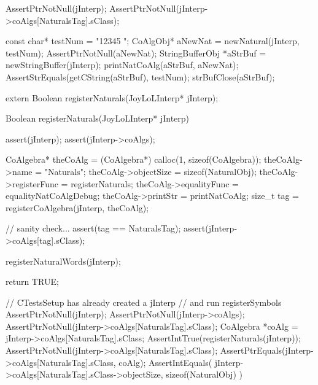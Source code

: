 
\startCTest
  AssertPtrNotNull(jInterp);
  AssertPtrNotNull(jInterp->coAlgs[NaturalsTag].sClass);

  const char* testNum = "12345 ";
  CoAlgObj* aNewNat = newNatural(jInterp, testNum);
  AssertPtrNotNull(aNewNat);
  StringBufferObj *aStrBuf = newStringBuffer(jInterp);
  printNatCoAlg(aStrBuf, aNewNat);
  AssertStrEquals(getCString(aStrBuf), testNum);
  strBufClose(aStrBuf);
\stopCTest
\stopTestCase
\stopTestSuite

\startTestSuite[registerSymbols]

\startCHeader
extern Boolean registerNaturals(JoyLoLInterp* jInterp);
\stopCHeader
{}

\startCCode
Boolean registerNaturals(JoyLoLInterp* jInterp) {
  assert(jInterp);
  assert(jInterp->coAlgs);
  
  CoAlgebra* theCoAlg    = (CoAlgebra*) calloc(1, sizeof(CoAlgebra));
  theCoAlg->name         = "Naturals";
  theCoAlg->objectSize   = sizeof(NaturalObj);
  theCoAlg->registerFunc = registerNaturals;
  theCoAlg->equalityFunc = equalityNatCoAlgDebug;
  theCoAlg->printStr     = printNatCoAlg;
  size_t tag = registerCoAlgebra(jInterp, theCoAlg);
  
  // sanity check...
  assert(tag == NaturalsTag);
  assert(jInterp->coAlgs[tag].sClass);

  registerNaturalWords(jInterp);

  return TRUE;
}
\stopCCode


\startCTest
  // CTestsSetup has already created a jInterp
  // and run registerSymbols
  AssertPtrNotNull(jInterp);
  AssertPtrNotNull(jInterp->coAlgs);
  AssertPtrNotNull(jInterp->coAlgs[NaturalsTag].sClass);
  CoAlgebra *coAlg = jInterp->coAlgs[NaturalsTag].sClass;
  AssertIntTrue(registerNaturals(jInterp));
  AssertPtrNotNull(jInterp->coAlgs[NaturalsTag].sClass);
  AssertPtrEquals(jInterp->coAlgs[NaturalsTag].sClass, coAlg);
  AssertIntEquals(
    jInterp->coAlgs[NaturalsTag].sClass->objectSize,
    sizeof(NaturalObj)
  )
\stopCTest
\stopTestCase
\stopTestSuite
